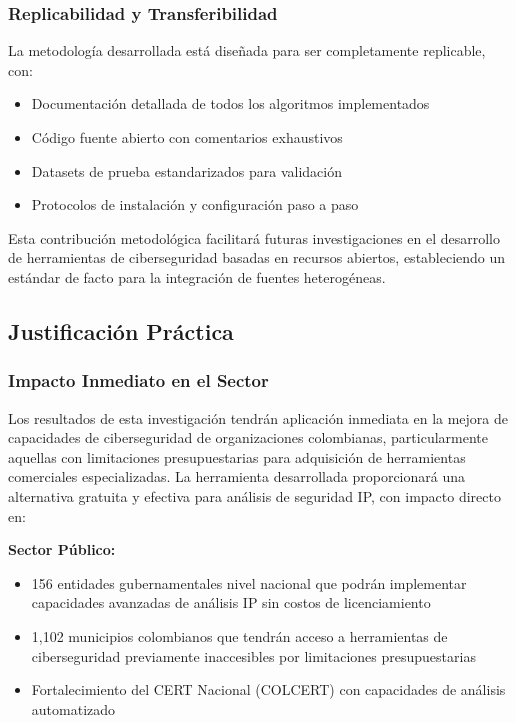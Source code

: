 \subsubsection{Replicabilidad y Transferibilidad}
La metodología desarrollada está diseñada para ser completamente replicable, con:
\begin{itemize}
    \item Documentación detallada de todos los algoritmos implementados
    \item Código fuente abierto con comentarios exhaustivos
    \item Datasets de prueba estandarizados para validación
    \item Protocolos de instalación y configuración paso a paso
\end{itemize}

Esta contribución metodológica facilitará futuras investigaciones en el desarrollo de herramientas de ciberseguridad basadas en recursos abiertos, estableciendo un estándar de facto para la integración de fuentes heterogéneas.

\subsection{Justificación Práctica}

\subsubsection{Impacto Inmediato en el Sector}
Los resultados de esta investigación tendrán aplicación inmediata en la mejora de capacidades de ciberseguridad de organizaciones colombianas, particularmente aquellas con limitaciones presupuestarias para adquisición de herramientas comerciales especializadas. La herramienta desarrollada proporcionará una alternativa gratuita y efectiva para análisis de seguridad IP, con impacto directo en:

\textbf{Sector Público:} 
\begin{itemize}
    \item 156 entidades gubernamentales nivel nacional que podrán implementar capacidades avanzadas de análisis IP sin costos de licenciamiento
    \item 1,102 municipios colombianos que tendrán acceso a herramientas de ciberseguridad previamente inaccesibles por limitaciones presupuestarias
    \item Fortalecimiento del CERT Nacional (COLCERT) con capacidades de análisis automatizado
\end{itemize}

